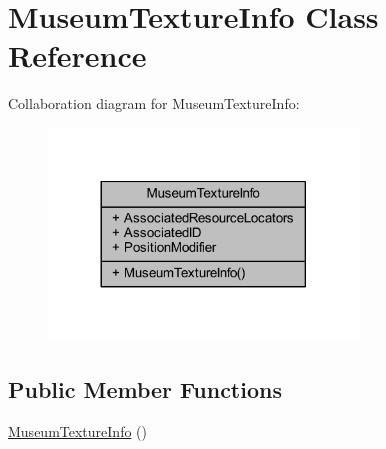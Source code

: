 \hypertarget{class_museum_texture_info}{}\section{Museum\+Texture\+Info Class Reference}
\label{class_museum_texture_info}


Collaboration diagram for Museum\+Texture\+Info\+:
\nopagebreak
\begin{figure}[H]
\begin{center}
\leavevmode
\includegraphics[width=233pt]{class_museum_texture_info__coll__graph}
\end{center}
\end{figure}
\subsection*{Public Member Functions}
\begin{DoxyCompactItemize}
\item 
\mbox{\hyperlink{class_museum_texture_info_a930fdf9cdf96752c649660bed901178f}{Museum\+Texture\+Info}} ()
\end{DoxyCompactItemize}
